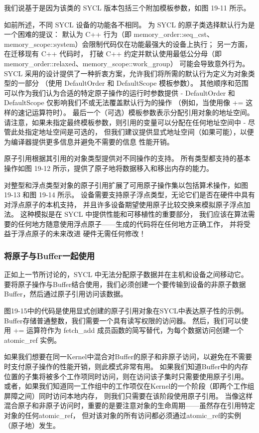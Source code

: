 我们说基于是因为该类的 SYCL 版本包括三个附加模板参数，如图 19-11 所示。

如前所述，不同 SYCL 设备的功能各不相同。 
为 SYCL 的原子类选择默认行为是一个困难的提议：
默认为 C++ 行为（即 memory\_order::seq\_cst、memory\_scope::system）会限制代码仅在功能最强大的设备上执行； 
另一方面，在迁移现有 C++ 代码时，
打破 C++ 约定并默认使用最低公分母（即 memory\_order::relaxed、memory\_scope::work\_group）
可能会导致意外行为。 
SYCL 采用的设计提供了一种折衷方案，允许我们将所需的默认行为定义为对象类型的一部分
（使用 DefaultOrder 和 DefaultScope 模板参数）。 
其他顺序和范围可以作为我们认为合适的特定原子操作的运行时参数提供
 - DefaultOrder 和 DefaultScope 仅影响我们不或无法覆盖默认行为的操作
 （例如，当使用像 += 这样的速记运算符时）。 最后一个（可选）模板参数表示分配引用对象的地址空间。 
 请注意，如果未指定最终模板参数，则引用的变量可以分配在任何地址空间中 - 尽管此处指定地址空间是可选的，
 但我们建议提供显式地址空间（如果可能），以便为编译器提供更多信息并避免不需要的信息 性能开销。

原子引用根据其引用的对象类型提供对不同操作的支持。 
所有类型都支持的基本操作如图 19-12 所示，提供了原子地将数据移入和移出内存的能力。

对整型和浮点类型对象的原子引用扩展了可用原子操作集以包括算术操作，如图 19-13 和图 19-14 所示。 
设备需要支持原子浮点类型，无论它们是否在硬件中具有对浮点原子的本机支持，
并且许多设备期望使用原子比较交换来模拟原子浮点加法。 
这种模拟是在 SYCL 中提供性能和可移植性的重要部分，
我们应该在算法需要的任何地方随意使用浮点原子——生成的代码将在任何地方正确工作，
并将受益于浮点原子的未来改进 硬件无需任何修改！

\subsubsection{将原子与Buffer一起使用}
正如上一节所讨论的，SYCL 中无法分配原子数据并在主机和设备之间移动它。 
要将原子操作与Buffer结合使用，我们必须创建一个要传输到设备的非原子数据Buffer，然后通过原子引用访问该数据。

图19-15中的代码是使用显式创建的原子引用对象在SYCL中表达原子性的示例。 
Buffer存储普通整数，我们需要一个具有读写权限的访问器。 
然后，我们可以使用 += 运算符作为 fetch\_add 成员函数的简写替代，为每个数据访问创建一个atomic\_ref 实例。

如果我们想要在同一Kernel中混合对Buffer的原子和非原子访问，以避免在不需要时支付原子操作的性能开销，则此模式非常有用。 
如果我们知道Buffer中的内存位置的子集将被多个工作项同时访问，则在访问该子集时只需要使用原子引用。 
或者，如果我们知道同一工作组中的工作项仅在Kernel的一个阶段（即两个工作组屏障之间）同时访问本地内存，
则我们只需要在该阶段使用原子引用。 
当像这样混合原子和非原子访问时，重要的是要注意对象的生命周期——虽然存在引用特定对象的任何atomic\_ref，
但对该对象的所有访问都必须通过atomic\_ref的实例（原子地）发生。

